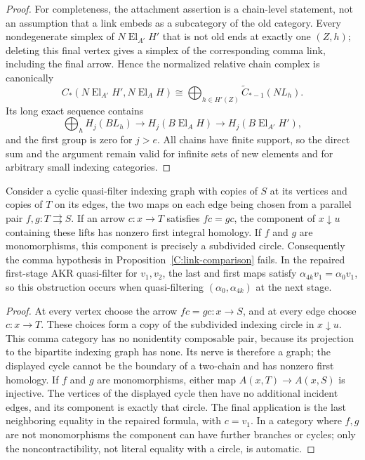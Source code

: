 \begin{proof}
For completeness, the attachment assertion is a chain-level statement,
not an assumption that a link embeds as a subcategory of the old category.
Every nondegenerate simplex of $N\operatorname{El}_{A'}H'$ that is not
old ends at exactly one $(Z,h)$; deleting this final vertex gives a
simplex of the corresponding comma link, including the final arrow.
Hence the normalized relative chain complex is canonically
\[
 C_*(N\operatorname{El}_{A'}H',N\operatorname{El}_A H)
 \cong\bigoplus_{h\in H'(Z)}\widetilde C_{*-1}(NL_h).
\]
Its long exact sequence contains
\[
 \bigoplus_h H_j(BL_h)\longrightarrow H_j(B\operatorname{El}_A H)
 \longrightarrow H_j(B\operatorname{El}_{A'}H'),
\]
and the first group is zero for $j>e$. All chains have finite support,
so the direct sum and the argument remain valid for infinite sets of
new elements and for arbitrary small indexing categories.
\end{proof}

\begin{proposition}\label{C:link-obstruction}
Consider a cyclic quasi-filter indexing graph with copies of $S$ at its
vertices and copies of $T$ on its edges, the two maps on each edge being
chosen from a parallel pair $f,g:T\rightrightarrows S$. If an arrow
$c:x\to T$ satisfies $fc=gc$, the component of $x\downarrow u$ containing
these lifts has nonzero first integral homology. If $f$ and $g$ are
monomorphisms, this component is precisely a subdivided circle.
Consequently the comma hypothesis in Proposition~\ref{C:link-comparison}
fails. In the repaired first-stage AKR quasi-filter for $v_1,v_2$, the
last and first maps satisfy $\alpha_{4k}v_1=\alpha_0v_1$, so this
obstruction occurs when quasi-filtering $(\alpha_0,\alpha_{4k})$ at the
next stage.
\end{proposition}
\begin{proof}
At every vertex choose the arrow $fc=gc:x\to S$, and at every edge
choose $c:x\to T$. These choices form a copy of the subdivided indexing
circle in $x\downarrow u$. This comma category has no nonidentity
composable pair, because its projection to the bipartite indexing graph
has none. Its nerve is therefore a graph; the displayed cycle cannot
be the boundary of a two-chain and has nonzero first homology. If $f$
and $g$ are monomorphisms, either map $A(x,T)\to A(x,S)$ is injective.
The vertices of the displayed cycle then have no additional incident
edges, and its component is exactly that circle. The final application
is the last neighboring equality in the repaired formula, with
$c=v_1$. In a category where $f,g$ are not monomorphisms the component
can have further branches or cycles; only the noncontractibility, not
literal equality with a circle, is automatic.
\end{proof}

